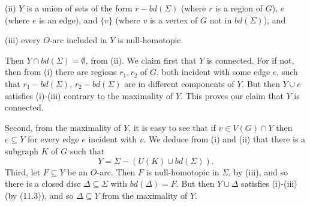 \hspace*{12pt}(ii) $Y$ is a union of sets of the form $r - bd(\Sigma)$ (where $r$ is a region of $G$), $e$ (where $e$ is an edge), and $\{v\}$ (where $v$ is a vertex of $G$ not in $bd(\Sigma)$), and

\hspace*{12pt}(iii) every $O$-arc included in $Y$ is null-homotopic.

Then $Y \cap bd(\Sigma) = \emptyset$, from (ii). We claim first that $Y$ is connected. For if not, then from (i) there are regions $r_1, r_2$ of $G$, both incident with some edge $e$, such that $r_1 - bd(\Sigma)$, $r_2 - bd(\Sigma)$ are in different components of $Y$. But then $Y \cup e$ satisfies (i)-(iii) contrary to the maximality of $Y$. This proves our claim that $Y$ is connected.

Second, from the maximality of $Y$, it is easy to see that if $v \in V(G) \cap Y$ then $e \subseteq Y$ for every edge $e$ incident with $v$. We deduce from (i) and (ii) that there is a subgraph $K$ of $G$ such that
\begin{equation*}
Y = \Sigma - (U(K) \cup bd(\Sigma)).
\end{equation*}
Third, let $F \subseteq Y$ be an $O$-arc. Then $F$ is null-homotopic in $\Sigma$, by (iii), and so there is a closed disc $\Delta \subseteq \Sigma$ with $bd(\Delta) = F$. But then $Y \cup \Delta$ satisfies (i)-(iii) (by (11.3)), and so $\Delta \subseteq Y$ from the maximality of $Y$.
